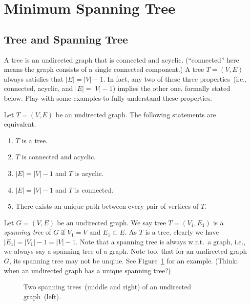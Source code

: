 \setcounter{definition}{0} \setcounter{property}{0} \setcounter{claim}{0} \setcounter{fact}{0} \setcounter{corollary}{0} \setcounter{figure}{0}
\section{Minimum Spanning Tree}

\subsection*{Tree and Spanning Tree}

A tree is an undirected graph that is connected and acyclic.
(``connected'' here means the graph consists of a single connected component.)
A tree $T = (V, E)$ always satisfies that $|E| = |V| - 1$.
In fact, any two of these three properties~(i.e., connected, acyclic, and $|E| = |V| - 1$)
implies the other one, formally stated below. Play with some examples
to fully understand these properties.

\begin{fact}\label{fact1}
Let $T = (V, E)$ be an undirected graph. The following statements are equivalent.
\vspace*{-\topsep}
\begin{enumerate}
\item $T$ is a tree.
\item $T$ is connected and acyclic.
\item $|E| = |V| - 1$ and $T$ is acyclic.
\item $|E| = |V| - 1$ and $T$ is connected.
\item There exists an unique path between every pair of vertices of $T$.
\end{enumerate}
\end{fact}

Let $G = (V,E)$ be an undirected graph.
We say tree $T = (V_1, E_1)$ is a \emph{spanning tree}
of $G$ if $V_1 = V$ and $E_1\subset E$.
As $T$ is a tree, clearly we have $|E_1| = |V_1| - 1 = |V| - 1$.
Note that a spanning tree is always w.r.t.\ a graph, i.e., we always
say a spanning tree of a graph. Note too, that for an undirected graph $G$, 
its spanning tree may not be unqiue. See Figure~\ref{fig:spanning}
for an example.  (Think: when an undirected graph has a unique spanning tree?)

\begin{figure}[h]
\centering{}
\caption{Two spanning trees~(middle and right) of an undirected graph~(left).}
\label{fig:spanning}
\end{figure}

